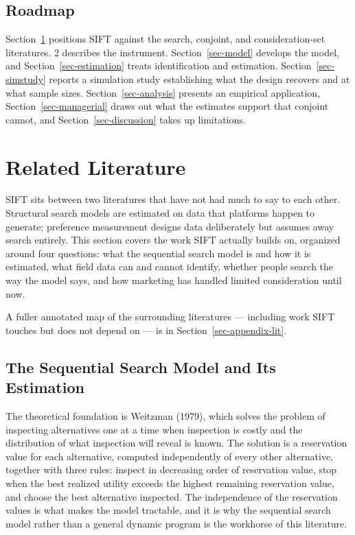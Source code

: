 \documentclass[
  letterpaper,
  DIV=11,
  numbers=noendperiod]{scrartcl}
\begin{document}
\subsection{Roadmap}\label{roadmap}

Section~\ref{sec-lit} positions SIFT against the search, conjoint, and
consideration-set literatures. 2 describes the instrument.
Section~\ref{sec-model} develops the model, and
Section~\ref{sec-estimation} treats identification and estimation.
Section~\ref{sec-simstudy} reports a simulation study establishing what
the design recovers and at what sample sizes. Section~\ref{sec-analysis}
presents an empirical application, Section~\ref{sec-managerial} draws
out what the estimates support that conjoint cannot, and
Section~\ref{sec-discussion} takes up limitations.

\section{Related Literature}\label{sec-lit}

SIFT sits between two literatures that have not had much to say to each
other. Structural search models are estimated on data that platforms
happen to generate; preference measurement designs data deliberately but
assumes away search entirely. This section covers the work SIFT actually
builds on, organized around four questions: what the sequential search
model is and how it is estimated, what field data can and cannot
identify, whether people search the way the model says, and how
marketing has handled limited consideration until now.

A fuller annotated map of the surrounding literatures --- including work
SIFT touches but does not depend on --- is in
Section~\ref{sec-appendix-lit}.

\subsection{The Sequential Search Model and Its
Estimation}\label{sec-lit-model}

The theoretical foundation is Weitzman (1979), which solves the problem
of inspecting alternatives one at a time when inspection is costly and
the distribution of what inspection will reveal is known. The solution
is a reservation value for each alternative, computed independently of
every other alternative, together with three rules: inspect in
decreasing order of reservation value, stop when the best realized
utility exceeds the highest remaining reservation value, and choose the
best alternative inspected. The independence of the reservation values
is what makes the model tractable, and it is why the sequential search
model rather than a general dynamic program is the workhorse of this
literature.
\end{document}
